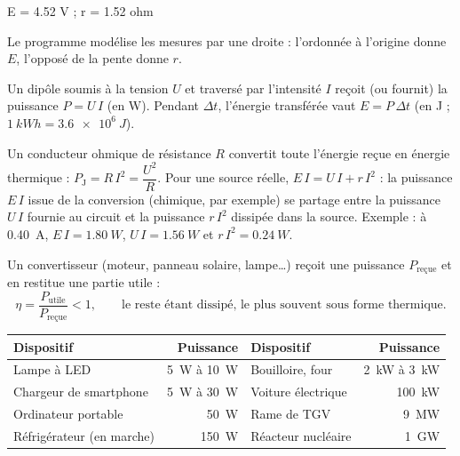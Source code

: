 \begin{console}
E = 4.52 V ; r = 1.52 ohm
\end{console}
\noindent{} Le programme modélise les mesures par une droite : l'ordonnée à l'origine donne $E$, l'opposé de la
pente donne $r$.
\begin{definition}
Un dipôle soumis à la tension $U$ et traversé par l'intensité $I$ reçoit (ou fournit) la puissance $P=U\,I$ (en W). Pendant $\Delta t$, l'énergie
transférée vaut $E=P\,\Delta t$ (en J ; $\qty{1}{kWh}=\qty{3,6e6}{J}$).
\end{definition}
\begin{loi}
Un conducteur ohmique de résistance $R$ convertit toute l'énergie reçue en énergie thermique : $P_\mathrm{J}=R\,I^2=\dfrac{U^2}{R}$. Pour une source
réelle, $E\,I=U\,I+r\,I^2$ : la puissance $E\,I$ issue de la conversion (chimique, par exemple) se partage entre la puissance $U\,I$
fournie au circuit et la puissance $r\,I^2$ dissipée dans la source. Exemple : à \qty{0,40}{A}, $E\,I=\qty{1,80}{W}$, $U\,I=\qty{1,56}{W}$ et $r\,I^2=\qty{0,24}{W}$.
\end{loi}
\begin{definition}
Un convertisseur (moteur, panneau solaire, lampe…) reçoit une puissance $P_\mathrm{reçue}$ et en restitue une partie utile :
\[\eta=\frac{P_\mathrm{utile}}{P_\mathrm{reçue}}<1,\qquad\text{le reste étant dissipé, le plus souvent sous forme thermique.}\]
\end{definition}
\par{}
\begin{propriete}
\par\smallskip\noindent\hfill\begin{tabular}{lr@{\qquad}lr}
\toprule
Dispositif & Puissance & Dispositif & Puissance \\
\midrule
Lampe à LED & \qty{5}{W} à \qty{10}{W} & Bouilloire, four & \qty{2}{kW} à \qty{3}{kW} \\
Chargeur de smartphone & \qty{5}{W} à \qty{30}{W} & Voiture électrique & \qty{100}{kW} \\
Ordinateur portable & \qty{50}{W} & Rame de TGV & \qty{9}{MW} \\
Réfrigérateur (en marche) & \qty{150}{W} & Réacteur nucléaire & \qty{1}{GW} \\
\bottomrule
\end{tabular}\hfill\null\par\smallskip
\end{propriete}
